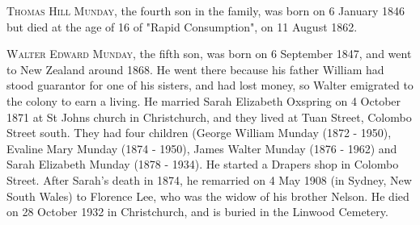 {\textsc{Thomas Hill Munday}, the fourth son in the family, was born on 6 January 1846 but died at the age of 16 of "Rapid Consumption", on 11 August 1862.

\textsc{Walter Edward Munday}, the fifth son, was born on 6 September 1847, and went to New Zealand around 1868. 	He went there because his father William had stood guarantor for one of his sisters, and had lost money, so Walter emigrated to the colony to earn a living. He married Sarah Elizabeth Oxspring on 4 October 1871 at St Johns church in Christchurch, and they lived at Tuan Street, Colombo Street south. They had four children (George William Munday (1872 - 1950),
Evaline Mary Munday (1874 - 1950), James Walter Munday (1876 - 1962) and Sarah Elizabeth Munday (1878 - 1934). He started a Drapers shop in Colombo Street.  After Sarah's death in 1874, he remarried on 4 May 1908 (in Sydney, New South Wales) to Florence Lee, who was the widow of his brother Nelson.  He died on 28 October 1932 in Christchurch, and is buried in the Linwood Cemetery.

}
